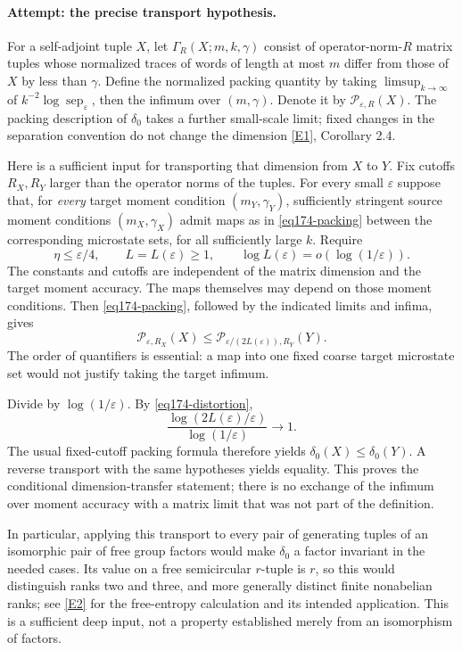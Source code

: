\documentclass[11pt,a4paper]{article}
\newcommand{\eps}{\varepsilon}
\newcommand{\eref}[2]{\hyperlink{extra:#1:#2}{[E#2]}}
\numberwithin{equation}{section}
\begin{document}
\paragraph{Attempt: the precise transport hypothesis.}
For a self-adjoint tuple $X$, let $\Gamma_R(X;m,k,\gamma)$ consist of
operator-norm-$R$ matrix tuples whose normalized traces of words of length
at most $m$ differ from those of $X$ by less than $\gamma$.
Define the normalized packing quantity by taking $\limsup_{k\to\infty}$
of $k^{-2}\log\operatorname{sep}_\eps$, then the infimum over
$(m,\gamma)$. Denote it by $\mathcal P_{\eps,R}(X)$.
The packing description of $\delta_0$ takes a further small-scale limit;
fixed changes in the separation convention do not change the dimension
\eref{174}{1}, Corollary 2.4.

Here is a sufficient input for transporting that dimension from $X$ to
$Y$. Fix cutoffs $R_X,R_Y$ larger than the operator norms of the tuples.
For every small $\eps$ suppose that, for \emph{every} target moment
condition $(m_Y,\gamma_Y)$, sufficiently stringent source moment conditions
$(m_X,\gamma_X)$ admit maps as in \eqref{eq174-packing} between the
corresponding microstate sets, for all sufficiently large $k$. Require
\begin{equation}\label{eq174-distortion}
 \eta\le\eps/4,\qquad L=L(\eps)\ge1,
 \qquad \log L(\eps)=o(\log(1/\eps)).
\end{equation}
The constants and cutoffs are independent of the matrix dimension and the
target moment accuracy. The maps themselves may depend on those moment
conditions. Then \eqref{eq174-packing}, followed by the indicated limits
and infima, gives
\begin{equation}\label{eq174-entropy}
 \mathcal P_{\eps,R_X}(X)
       \le \mathcal P_{\eps/(2L(\eps)),R_Y}(Y).
\end{equation}
The order of quantifiers is essential: a map into one fixed coarse target
microstate set would not justify taking the target infimum.

Divide by $\log(1/\eps)$. By \eqref{eq174-distortion},
\[
 \frac{\log(2L(\eps)/\eps)}{\log(1/\eps)}\longrightarrow1.
\]
The usual fixed-cutoff packing formula therefore yields
$\delta_0(X)\le\delta_0(Y)$. A reverse transport with the same hypotheses
yields equality. This proves the conditional dimension-transfer statement;
there is no exchange of the infimum over moment accuracy with a matrix
limit that was not part of the definition.

In particular, applying this transport to every pair of generating tuples
of an isomorphic pair of free group factors would make $\delta_0$ a factor
invariant in the needed cases. Its value on a free semicircular $r$-tuple
is $r$, so this would distinguish ranks two and three, and more generally
distinct finite nonabelian ranks; see \eref{174}{2} for the free-entropy
calculation and its intended application. This is a sufficient deep input,
not a property established merely from an isomorphism of factors.
\end{document}
